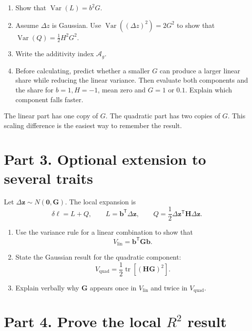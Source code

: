 \documentclass[11pt]{article}
\newcommand{\G}{\mathbf G}
\newcommand{\bvec}{\mathbf b}
\newcommand{\Hess}{\mathbf H}
\newcommand{\dz}{\Delta\mathbf z}
\newcommand{\Ag}{\mathcal A_g}
\newcommand{\Vlin}{V_{\mathrm{lin}}}
\newcommand{\Vquad}{V_{\mathrm{quad}}}
\newcommand{\tr}{\operatorname{tr}}
\newcommand{\Var}{\operatorname{Var}}
\begin{document}
\begin{enumerate}
\item Show that \(\Var(L)=b^2G\).
\item Assume \(\Delta z\) is Gaussian. Use \(\Var((\Delta z)^2)=2G^2\) to show that \(\Var(Q)=\frac12H^2G^2\).
\item Write the additivity index \(\Ag\).
\item Before calculating, predict whether a smaller $G$ can produce a larger linear share while reducing the linear variance. Then evaluate both components and the share for $b=1,H=-1$, mean zero and $G=1$ or $0.1$. Explain which component falls faster.
\end{enumerate}

\begin{hintbox}
The linear part has one copy of \(G\). The quadratic part has two copies of \(G\). This scaling difference is the easiest way to remember the result.
\end{hintbox}

\section*{Part 3. Optional extension to several traits}

Let \(\dz\sim N(\mathbf 0,\G)\). The local expansion is
\begin{equation}
\delta\ell=L+Q,
\qquad
L=\bvec^{\mathsf T}\dz,
\qquad
Q=\frac12\dz^{\mathsf T}\Hess\dz.
\end{equation}

\begin{enumerate}
\item Use the variance rule for a linear combination to show that
\begin{equation}
\Vlin=\bvec^{\mathsf T}\G\bvec.
\end{equation}
\item State the Gaussian result for the quadratic component:
\begin{equation}
\Vquad=\frac12\tr[(\Hess\G)^2].
\end{equation}
\item Explain verbally why \(\G\) appears once in \(\Vlin\) and twice in \(\Vquad\).
\end{enumerate}

\section*{Part 4. Prove the local \texorpdfstring{\(R^2\)}{R2} result}
\end{document}
